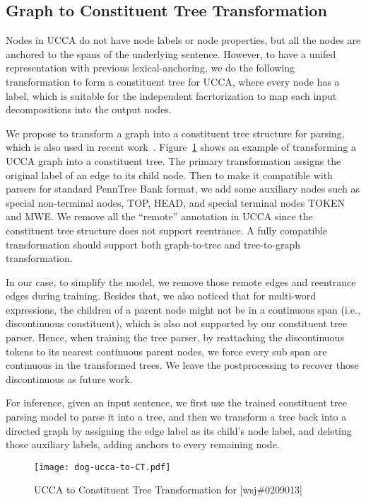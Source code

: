 
\subsection{Graph to Constituent Tree Transformation}
\label{ssec:phr:graph-ct}
Nodes in UCCA do not have node labels or node properties, but all the
nodes are anchored to the spans of the underlying sentence. However,
to have a unifed representation with previous lexical-anchoring, we do
the following transformation to form a constituent tree for UCCA,
where every node has a label, which is suitable for the independent
facrtorization to map each input decompositions into the output nodes.

 We propose to transform a graph
into a constituent tree structure for parsing, which is also used in
recent work~\cite{jiang2019hlt}.  Figure~\ref{fig:ucca-to-CT} shows an
example of transforming a UCCA graph into a constituent tree. The
primary transformation assigns the original label of an edge to its
child node. Then to make it compatible with parsers for standard
PennTree Bank format, we add some auxiliary nodes such as special
non-terminal nodes, TOP, HEAD, and special terminal nodes TOKEN and
MWE. We remove all the ``remote'' annotation in UCCA since the
constituent tree structure does not support reentrance.  A fully
compatible transformation should support both graph-to-tree and
tree-to-graph transformation.

In our case, to simplify the model, we remove those remote edges and
reentrance edges during training. Besides that, we also noticed that
for multi-word expressions, the children of a parent node might not be
in a continuous span (i.e., discontinuous constituent), which is also
not supported by our constituent tree parser. Hence, when training the
tree parser, by reattaching the discontinuous tokens to its nearest
continuous parent nodes, we force every sub span are continuous in the
transformed trees. We leave the postprocessing to recover those
discontinuous as future work.

For inference, given an input sentence, we first use the trained
constituent tree parsing model to parse it into a tree, and then we
transform a tree back into a directed graph by assigning the edge
label as its child's node label, and deleting those auxiliary labels,
adding anchors to every remaining node.

\begin{figure}[!h]
\centering
\texttt{[image: dog-ucca-to-CT.pdf]}
\caption{\label{fig:ucca-to-CT} UCCA to Constituent Tree Transformation for [wsj\#0209013]}
\end{figure}

